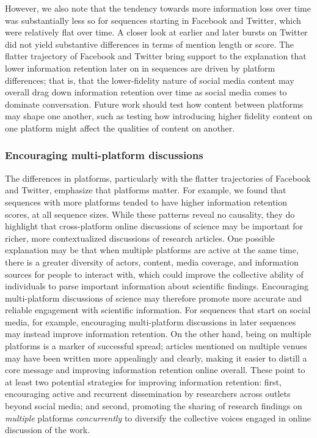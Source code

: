 \documentclass[letterpaper]{article} %
\begin{document}
However, we also note that the tendency towards more information loss over time was substantially less so for sequences starting in Facebook and Twitter, which were relatively flat over time. A closer look at earlier and later bursts on Twitter did not yield substantive differences in terms of mention length or score. The flatter trajectory of Facebook and Twitter bring support to the explanation that lower information retention later on in sequences are driven by platform differences; that is, that the lower-fidelity nature of social media content may overall drag down information retention over time as social media comes to dominate conversation. Future work should test how content between platforms may shape one another, such as testing how introducing higher fidelity content on one platform might affect the qualities of content on another.

\subsubsection{Encouraging multi-platform discussions}
The differences in platforms, particularly with the flatter trajectories of Facebook and Twitter, emphasize that platforms matter. For example, we found that sequences with more platforms tended to have higher information retention scores, at all sequence sizes. While these patterns reveal no causality, they do highlight that cross-platform online discussions of science may be important for richer, more contextualized discussions of research articles. One possible explanation may be that when multiple platforms are active at the same time, there is a greater diversity of actors, content, media coverage, and information sources for people to interact with, which could improve the collective ability of individuals to parse important information about scientific findings.
Encouraging multi-platform discussions of science may therefore promote more accurate and reliable engagement with scientific information. For sequences that start on social media, for example, encouraging multi-platform discussions in later sequences may instead improve information retention.
On the other hand, being on multiple platforms is a marker of successful spread; articles mentioned on multiple venues may have been written more appealingly and clearly, making it easier to distill a core message and improving information retention online overall.
These point to at least two potential strategies for improving information retention: first, encouraging active and recurrent dissemination by researchers across outlets beyond social media; and second, promoting the sharing of research findings on \textit{multiple} platforms \textit{concurrently} to diversify the collective voices engaged in online discussion of the work.
\end{document}
